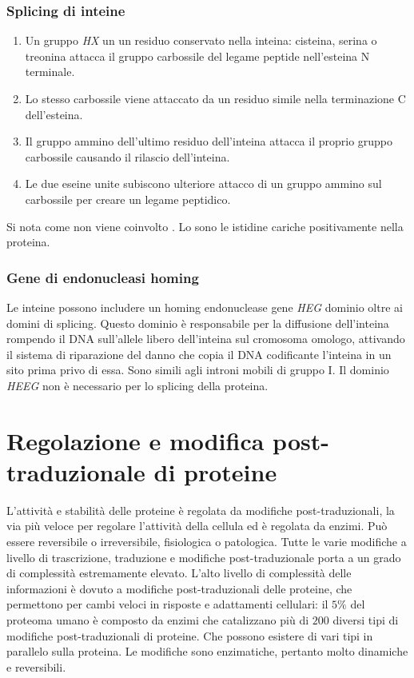 \subsubsection{Splicing di inteine}
\begin{enumerate}
	\item Un gruppo \emph{HX} un un residuo conservato nella inteina: cisteina, serina o treonina attacca il gruppo carbossile del legame peptide nell'esteina N terminale. 
	\item Lo stesso carbossile viene attaccato da un residuo simile nella terminazione C dell'esteina.
	\item Il gruppo ammino dell'ultimo residuo dell'inteina attacca il proprio gruppo carbossile causando il rilascio dell'inteina. 
	\item Le due eseine unite subiscono ulteriore attacco di un gruppo ammino sul carbossile per creare un legame peptidico.
\end{enumerate}
Si nota come non viene coinvolto \emph{}. Lo sono le istidine cariche positivamente nella proteina. 
\subsubsection{Gene di endonucleasi homing}
Le inteine possono includere un homing endonuclease gene \emph{HEG} dominio oltre ai domini di splicing. Questo dominio \`e responsabile per la diffusione dell'inteina rompendo il DNA sull'allele libero dell'inteina
sul cromosoma omologo, attivando il sistema di riparazione del danno che copia il DNA codificante l'inteina in un sito prima privo di essa. Sono simili agli introni mobili di gruppo I. Il dominio \emph{HEEG} non \`e necessario
per lo splicing della proteina. 
\section{Regolazione e modifica post-traduzionale di proteine}
L'attivit\`a e stabilit\`a delle proteine \`e regolata da modifiche post-traduzionali, la via pi\`u veloce per regolare l'attivit\`a della cellula ed \`e regolata da enzimi. Pu\`o essere reversibile o irreversibile, 
fisiologica o patologica. Tutte le varie modifiche a livello di trascrizione, traduzione e modifiche post-traduzionale porta a un grado di complessit\`a estremamente elevato. L'alto livello di complessit\`a delle informazioni
\`e dovuto a modifiche post-traduzionali delle proteine, che permettono per cambi veloci in risposte e adattamenti cellulari: il $5\%$ del proteoma umano \`e composto da enzimi che catalizzano pi\`u di $200$ diversi tipi 
di modifiche post-traduzionali di proteine. Che possono esistere di vari tipi in parallelo sulla proteina. Le modifiche sono enzimatiche, pertanto molto dinamiche e reversibili.
